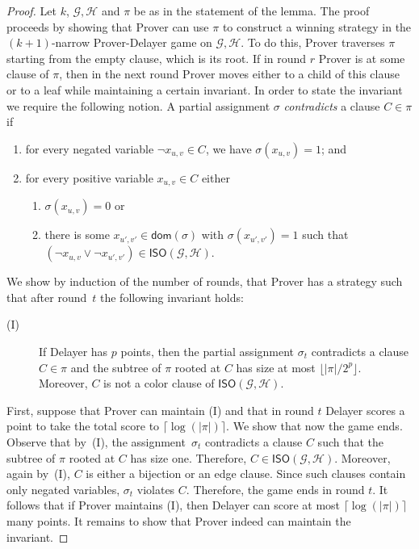 \documentclass[a4paper,english, thm-restate]{lipics-v2021}
\newcommand{\defining}[1]{\emph{#1}}
\newcommand{\graphG}{\mathcal{G}}
\newcommand{\graphH}{\mathcal{H}}
\newcommand{\dom}{\mathsf{dom}}
\newcommand{\ISO}{\mathsf{ISO}(\graphG, \graphH)}
\begin{document}
%
\begin{proof}
Let $k$, $\graphG, \graphH$ and $\pi$ be as in the statement of the lemma. The proof proceeds by showing that Prover can use $\pi$ to construct a winning strategy in the $(k+1)$-narrow Prover-Delayer game on $\graphG, \graphH$.
To do this, Prover traverses $\pi$ starting from the empty clause, which is its root. If in round $r$ Prover is at some clause of $\pi$, then in the next round Prover moves either to a child of this clause or to a leaf while maintaining a certain invariant. 
In order to state the invariant we require the following notion.
A partial assignment $\sigma$ \defining{contradicts} a clause $C \in \pi$ if
\begin{enumerate}
\item for every negated variable $\neg x_{u,v} \in C$, we have $\sigma(x_{u,v}) = 1$; and 
\item for every positive variable $x_{u,v} \in C$ either
\begin{enumerate}
\item $\sigma(x_{u,v}) = 0$ or
\item there is some $x_{u',v'} \in \dom(\sigma)$ with $\sigma(x_{u', v'}) = 1$ such that $(\neg x_{u,v} \vee \neg x_{u', v'} ) \in \ISO$.
\end{enumerate} 
\end{enumerate}
\noindent We show by induction of the number of rounds,
that Prover has a strategy such that after round~$t$ the following invariant holds:
\begin{description}
\item[(I)]  If Delayer has $p$ points,
then the partial assignment $\sigma_{t}$ contradicts a clause $C \in \pi$
and the subtree of $\pi$ rooted at $C$ has size at most $\lfloor |\pi| / 2^p \rfloor$. Moreover, $C$ is not a color clause of $\ISO$.
\end{description}
 
First, suppose that Prover can maintain (I) and that in round $t$ Delayer scores a point to take the total score to $\lceil \log(|\pi|) \rceil$.
We show that now the game ends.
Observe that by~(I), the assignment~$\sigma_{t}$ contradicts a clause $C$ such that the 
subtree of $\pi$ rooted at $C$ has size one. Therefore, $C \in \ISO$. Moreover, again by~(I), $C$ is either a bijection or an edge clause. Since such clauses contain only negated variables, $\sigma_{t}$ violates $C$.
Therefore, the game ends in round $t$.
It follows that if Prover maintains (I), then Delayer can score at most $\lceil \log(|\pi|) \rceil$ many points.
It remains to show that Prover indeed can maintain the invariant.


\end{proof}
\end{document}
